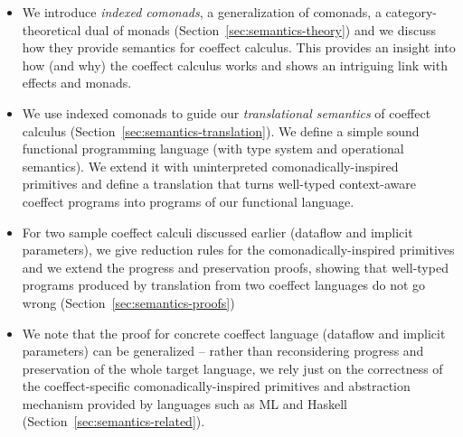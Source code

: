 \begin{itemize}
\item We introduce \emph{indexed comonads}, a generalization of comonads, a category-theoretical
  dual of monads (Section~\ref{sec:semantics-theory}) and we discuss how they provide semantics
  for coeffect calculus. This provides an insight into how (and why) the coeffect calculus works and
  shows an intriguing link with effects and monads.

\item We use indexed comonads to guide our \emph{translational semantics} of coeffect calculus
  (Section~\ref{sec:semantics-translation}). We define a simple sound functional programming
  language (with type system and operational semantics). We extend it with uninterpreted
  comonadically-inspired primitives and define a translation that turns well-typed context-aware
  coeffect programs into programs of our functional language.

\item For two sample coeffect calculi discussed earlier (dataflow and implicit parameters),
  we give reduction rules for the comonadically-inspired primitives and we extend the progress
  and preservation proofs, showing that well-typed programs produced by translation from two
  coeffect languages do not go wrong (Section~\ref{sec:semantics-proofs})

\item We note that the proof for concrete coeffect language (dataflow and implicit parameters) can
  be generalized -- rather than reconsidering progress and preservation of the whole target
  language, we rely just on the correctness of the coeffect-specific comonadically-inspired
  primitives and abstraction mechanism provided by languages such as ML and Haskell
  (Section~\ref{sec:semantics-related}).
\end{itemize}


%
%

